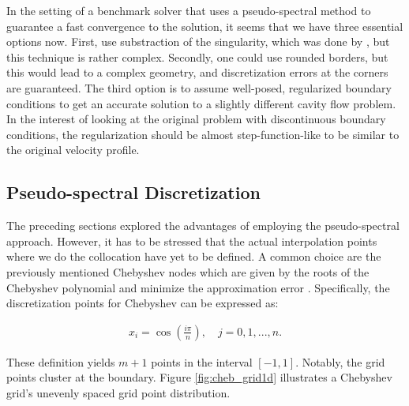In the setting of a benchmark solver that uses a pseudo-spectral method to
guarantee a fast convergence to the solution, it seems that we have three
essential options now. First, use substraction of the singularity, which was
done by \citep{botella1998}, but this technique is rather complex. Secondly,
one could use rounded borders, but this would lead to a complex geometry, and
discretization errors at the corners are guaranteed. The third option is to
assume well-posed, regularized boundary conditions to get an accurate solution
to a slightly different cavity flow problem. In the interest of looking at the
original problem with discontinuous boundary conditions, the regularization
should be almost step-function-like to be similar to the original velocity
profile.

\subsection{Pseudo-spectral Discretization}

The preceding sections explored the advantages of employing the pseudo-spectral
approach. However, it has to be stressed that the actual interpolation points
where we do the collocation have yet to be defined. A common choice are the
previously mentioned Chebyshev nodes which are given by the roots of the
Chebyshev polynomial and minimize the approximation error \citep{boyd2001}.
Specifically, the discretization points for Chebyshev can be expressed as:

\begin{align}
x_i = \cos(\frac{i \pi}{n}), \quad j=0, 1,...,n.
\label{eq:cheb_nodes1d}
\end{align}

These definition yields $m+1$ points in the interval $[-1, 1]$. Notably, the
grid points cluster at the boundary. Figure \ref{fig:cheb_grid1d} illustrates a
Chebyshev grid's unevenly spaced grid point distribution.


